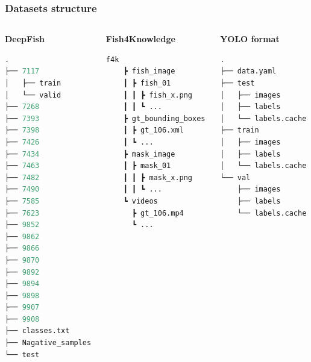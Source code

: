 \documentclass[serif]{beamer}  %
\begin{document}
\begin{frame}[fragile]
\frametitle{Datasets structure}
\begin{columns}
\begin{column}{0.3\textwidth}
\centering
\textbf{DeepFish}
\begin{lstlisting}[language=python]
.
├── 7117
│   ├── train
│   └── valid
├── 7268
├── 7393
├── 7398
├── 7426
├── 7434
├── 7463
├── 7482
├── 7490
├── 7585
├── 7623
├── 9852
├── 9862
├── 9866
├── 9870
├── 9892
├── 9894
├── 9898
├── 9907
├── 9908
├── classes.txt
├── Nagative_samples
└── test
\end{lstlisting}
\end{column}

\begin{column}{0.3\textwidth}
\centering
\textbf{Fish4Knowledge}
\begin{lstlisting}[language=python]
    f4k
    ┣ fish_image
    ┃ ┣ fish_01
    ┃ ┃ ┣ fish_x.png
    ┃ ┃ ┗ ...
    ┣ gt_bounding_boxes
    ┃ ┣ gt_106.xml
    ┃ ┗ ...
    ┣ mask_image
    ┃ ┣ mask_01
    ┃ ┃ ┣ mask_x.png
    ┃ ┃ ┗ ...
    ┗ videos
      ┣ gt_106.mp4
      ┗ ...

\end{lstlisting}
\end{column}

\begin{column}{0.3\textwidth}
\centering
\textbf{YOLO format}
\begin{lstlisting}[language=python]
.
├── data.yaml
├── test
│   ├── images
│   ├── labels
│   └── labels.cache
├── train
│   ├── images
│   ├── labels
│   └── labels.cache
└── val
    ├── images
    ├── labels
    └── labels.cache
\end{lstlisting}
\end{column}
\end{columns}
\end{frame}
\end{document}
